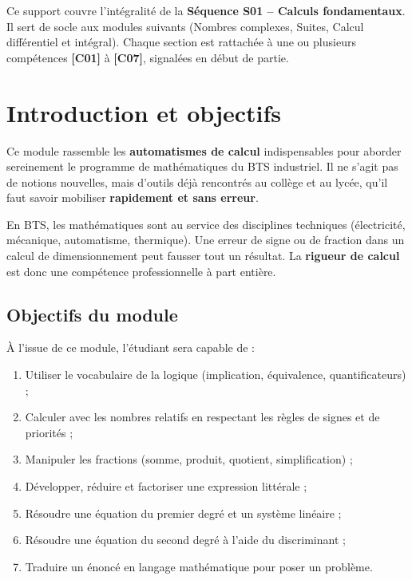 \documentclass[a4paper,11pt]{article}
\begin{document}
\vspace{0.5cm}

\begin{remarque}
Ce support couvre l'intégralité de la \textbf{Séquence S01 -- Calculs fondamentaux}. Il sert de socle aux modules suivants (Nombres complexes, Suites, Calcul différentiel et intégral). Chaque section est rattachée à une ou plusieurs compétences \textbf{[C01]} à \textbf{[C07]}, signalées en début de partie.
\end{remarque}

\newpage

\tableofcontents
\newpage

\section{Introduction et objectifs}

Ce module rassemble les \textbf{automatismes de calcul} indispensables pour aborder sereinement le programme de mathématiques du BTS industriel. Il ne s'agit pas de notions nouvelles, mais d'outils déjà rencontrés au collège et au lycée, qu'il faut savoir mobiliser \textbf{rapidement et sans erreur}.

\begin{remarque}
En BTS, les mathématiques sont au service des disciplines techniques (électricité, mécanique, automatisme, thermique). Une erreur de signe ou de fraction dans un calcul de dimensionnement peut fausser tout un résultat. La \textbf{rigueur de calcul} est donc une compétence professionnelle à part entière.
\end{remarque}

\subsection{Objectifs du module}
À l'issue de ce module, l'étudiant sera capable de :
\begin{enumerate}
  \item Utiliser le vocabulaire de la logique (implication, équivalence, quantificateurs) ;
  \item Calculer avec les nombres relatifs en respectant les règles de signes et de priorités ;
  \item Manipuler les fractions (somme, produit, quotient, simplification) ;
  \item Développer, réduire et factoriser une expression littérale ;
  \item Résoudre une équation du premier degré et un système linéaire ;
  \item Résoudre une équation du second degré à l'aide du discriminant ;
  \item Traduire un énoncé en langage mathématique pour poser un problème.
\end{enumerate}
\end{document}
